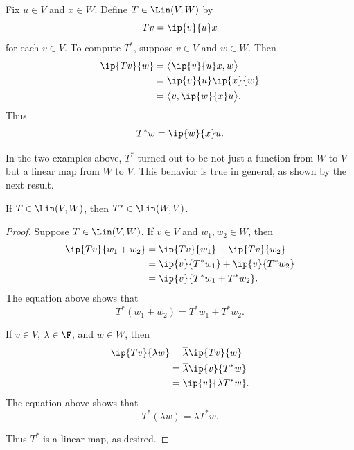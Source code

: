 \begin{example}%
\label{ax:7.3}
Fix $u\in V$ and $x\in W$. Define $T\in\Lin(V,W)$ by
\[ Tv = \ip{v}{u}x \]
for each $v\in V$. To compute $T^*$, suppose $v\in V$ and $w\in W$. Then
\begin{align*}
\ip{Tv}{w} &= \bigl\langle \ip{v}{u}x,w\bigr\rangle\\
           &= \ip{v}{u}\ip{x}{w}\\
           &= \bigl\langle v,\ip{w}{x}u\bigr\rangle.
\end{align*}
Thus
\[ T^*w = \ip{w}{x}u. \]
\end{example}

%
In the two examples above, $T^*$ turned out to be not just a function from $W$
to $V$ but a linear map from $W$ to $V$. This behavior is true in general, as
shown by the next result.

\begin{result}\label{ax:7.4}
If $T\in\Lin(V,W)$, then $T^*\in\Lin(W,V)$.
\end{result}

\begin{proof}
Suppose $T\in\Lin(V,W)$. If $v\in V$ and $w_1,w_2\in W$, then
\begin{align*}
\ip{Tv}{w_1+w_2} &= \ip{Tv}{w_1}+\ip{Tv}{w_2}\\
                 &= \ip{v}{T^*w_1}+\ip{v}{T^*w_2}\\
                 &= \ip{v}{T^*w_1+T^*w_2}.
\end{align*}
The equation above shows that
\[ T^*(w_1+w_2) = T^*w_1+T^*w_2. \]

If $v\in V$, $\lambda\in\F$, and $w\in W$, then
\begin{align*}
\ip{Tv}{\lambda w} &= \overline{\lambda}\ip{Tv}{w}\\
                   &= \overline{\lambda}\ip{v}{T^*w}\\
                   &= \ip{v}{\lambda T^*w}.
\end{align*}
The equation above shows that
\[ T^*(\lambda w) = \lambda T^*w. \]

Thus $T^*$ is a linear map, as desired.
\end{proof}


